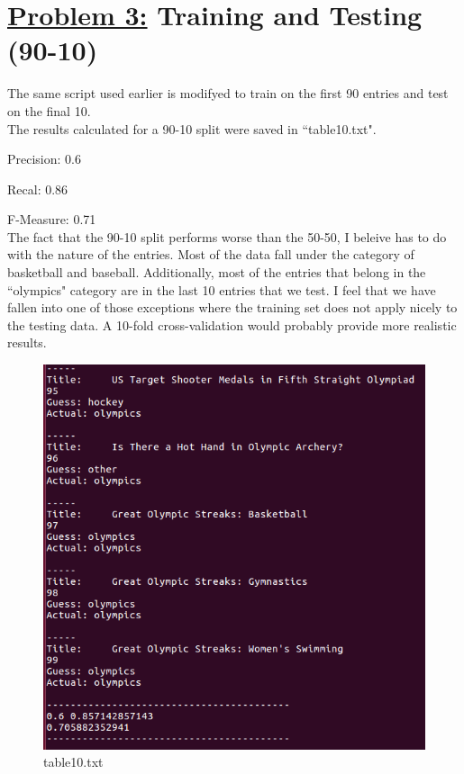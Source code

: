 \documentclass{article}
\begin{document}
\section*{{\underline{\huge {Problem 3:}} Training and Testing (90-10) }}
The same script used earlier is modifyed to train on the first 90 entries and test on the final 10.\\
The results calculated for a 90-10 split were saved in ``table10.txt".

Precision: 0.6

Recal: 0.86

F-Measure: 0.71\\

The fact that the 90-10 split performs worse than the 50-50, I beleive has to do with the nature of the entries. Most of the data fall under the category of basketball and baseball. Additionally, most of the entries that belong in the ``olympics" category are in the last 10 entries that we test. I feel that we have fallen into one of those exceptions where the training set does not apply nicely to the testing data. A 10-fold cross-validation would probably provide more realistic results.

\begin{figure} [H]
 \centering
 \includegraphics[height = 10 cm]{res2.png}
 \caption{table10.txt}
\end{figure}
\end{document}
